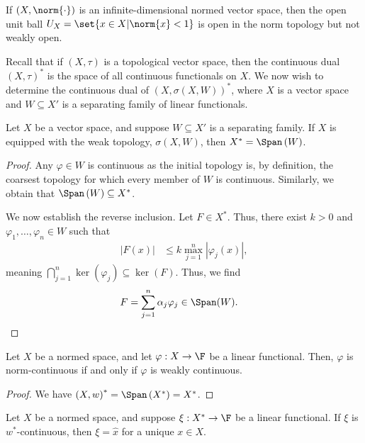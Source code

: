 \documentclass[10pt]{mypackage}
\begin{document}
\begin{corollary}
  If $\left(X,\norm{\cdot}\right)$ is an infinite-dimensional normed vector space, then the open unit ball $U_{X} = \set{x\in X | \norm{x} < 1}$ is open in the norm topology but not weakly open.
\end{corollary}
Recall that if $\left(X,\tau\right)$ is a topological vector space, then the continuous dual $\left(X,\tau\right)^{\ast}$ is the space of all continuous functionals on $X$. We now wish to determine the continuous dual of $\left(X,\sigma\left(X,W\right)\right)^{\ast}$, where $X$ is a vector space and $W\subseteq X'$ is a separating family of linear functionals.
\begin{proposition}
  Let $X$ be a vector space, and suppose $W\subseteq X'$ is a separating family. If $X$ is equipped with the weak topology, $\sigma\left(X,W\right)$, then $X^{\ast} = \Span\left(W\right)$.
\end{proposition}
\begin{proof}
  Any $\varphi\in W$ is continuous as the initial topology is, by definition, the coarsest topology for which every member of $W$ is continuous. Similarly, we obtain that $\Span\left(W\right) \subseteq X^{\ast}$.\newline

  We now establish the reverse inclusion. Let $F\in X^{\ast}$. Thus, there exist $k > 0$ and $\varphi_1,\dots,\varphi_n\in W$ such that
  \begin{align*}
    \left\vert F(x) \right\vert &\leq k\max_{j=1}^{n}\left\vert \varphi_j\left(x\right) \right\vert,
  \end{align*}
  meaning $\bigcap_{j=1}^{n}\ker\left(\varphi_j\right)\subseteq \ker(F)$. Thus, we find
  \begin{align*}
    F &= \sum_{j=1}^{n}\alpha_j\varphi_j\in \Span(W).
  \end{align*}
  
\end{proof}
\begin{corollary}
  Let $X$ be a normed space, and let $\varphi: X\rightarrow \F$ be a linear functional. Then, $\varphi$ is norm-continuous if and only if $\varphi$ is weakly continuous.
\end{corollary}
\begin{proof}
  We have $\left(X,w\right)^{\ast} = \Span\left(X^{\ast}\right) = X^{\ast}$.
\end{proof}
\begin{corollary}
  Let $X$ be a normed space, and suppose $\xi: X^{\ast}\rightarrow \F$ be a linear functional. If $\xi$ is $w^{\ast}$-continuous, then $\xi = \hat{x}$ for a unique $x\in X$.
\end{corollary}
\end{document}
